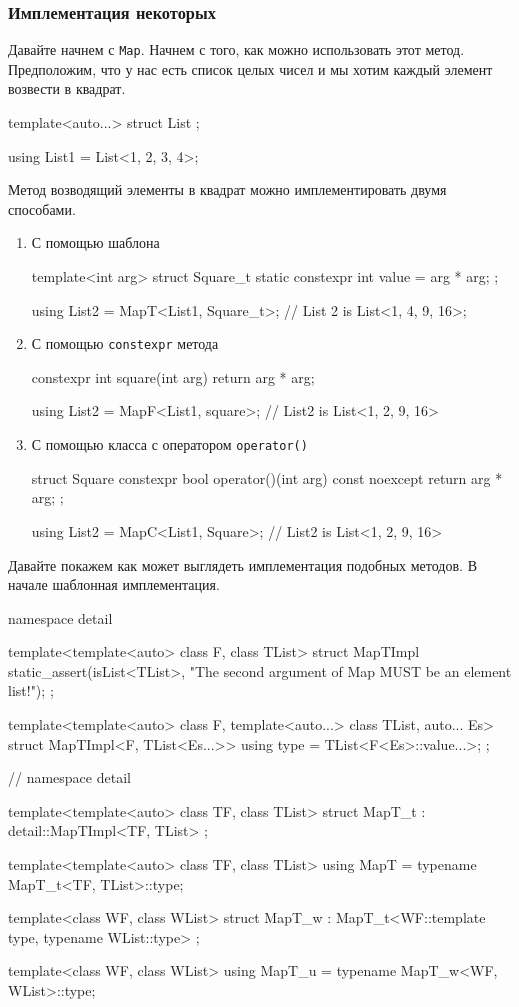 \subsubsection{Имплементация некоторых}
\label{section::TListOpsImpl}

Давайте начнем с \verb"Map".
Начнем с того, как можно использовать этот метод.
Предположим, что у нас есть список целых чисел и мы хотим каждый элемент возвести в квадрат.
\begin{cppcode}
template<auto...>
struct List {};

using List1 = List<1, 2, 3, 4>;
\end{cppcode}
Метод возводящий элементы в квадрат можно имплементировать двумя способами.
\begin{enumerate}
\item С помощью шаблона
\begin{cppcode}
template<int arg>
struct Square_t {
  static constexpr int value = arg * arg;
};

using List2 = MapT<List1, Square_t>;
// List 2 is List<1, 4, 9, 16>;
\end{cppcode}

\item С помощью \verb"constexpr" метода
\begin{cppcode}
constexpr int square(int arg) {
  return arg * arg;
}

using List2 = MapF<List1, square>;
// List2 is List<1, 2, 9, 16>
\end{cppcode}

\item С помощью класса с оператором \verb"operator()"
\begin{cppcode}
struct Square {
  constexpr bool operator()(int arg) const noexcept {
    return arg * arg;
  }
};

using List2 = MapC<List1, Square>;
// List2 is List<1, 2, 9, 16>
\end{cppcode}
\end{enumerate}
Давайте покажем как может выглядеть имплементация подобных методов.
В начале шаблонная имплементация.
\begin{cppcode}
namespace detail {
template<template<auto> class F, class TList>
struct MapTImpl {
  static_assert(isList<TList>,
                "The second argument of Map MUST be an element list!");
};

template<template<auto> class F, template<auto...> class TList, auto... Es>
struct MapTImpl<F, TList<Es...>> {
  using type = TList<F<Es>::value...>;
};
} // namespace detail

template<template<auto> class TF, class TList>
struct MapT_t : detail::MapTImpl<TF, TList> {};

template<template<auto> class TF, class TList>
using MapT = typename MapT_t<TF, TList>::type;

template<class WF, class WList>
struct MapT_w : MapT_t<WF::template type, typename WList::type> {};

template<class WF, class WList>
using MapT_u = typename MapT_w<WF, WList>::type;
\end{cppcode}
